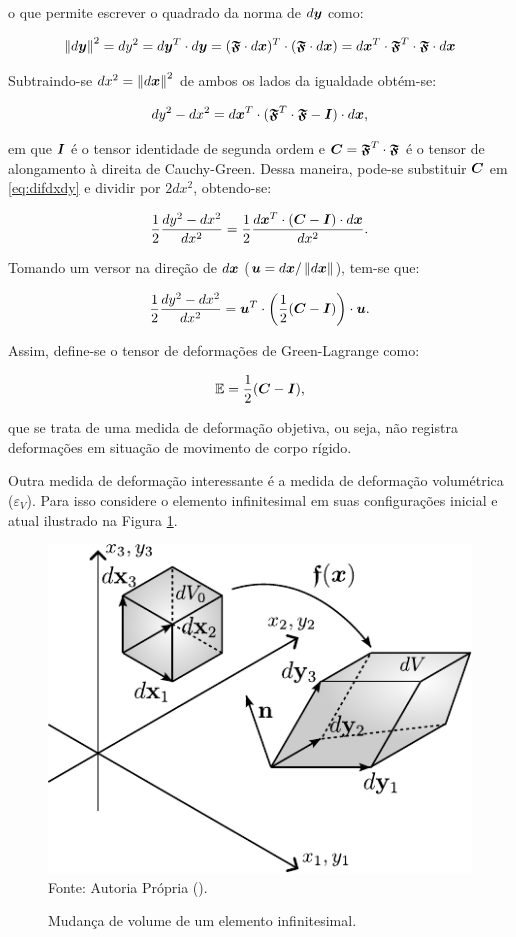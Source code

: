 \noindent o que permite escrever o quadrado da norma de $d\boldsymbol{y}$ como:

\[
    \left\lVert{d\boldsymbol{y}}\right\lVert^2=dy^2=d\boldsymbol{y}^T\cdot d\boldsymbol{y}=(\boldsymbol{\mathfrak{F}}\cdot d\boldsymbol{x})^T\cdot(\boldsymbol{\mathfrak{F}}\cdot d\boldsymbol{x})=d\boldsymbol{x}^T\cdot\boldsymbol{\mathfrak{F}}^T\cdot\boldsymbol{\mathfrak{F}}\cdot d\boldsymbol{x}
\]

Subtraindo-se $dx^2=\left\lVert{d\boldsymbol{x}}\right\lVert^2$ de ambos os lados da igualdade obtém-se:

\begin{equation}
    dy^2-dx^2=d\boldsymbol{x}^T\cdot(\boldsymbol{\mathfrak{F}}^T\cdot\boldsymbol{\mathfrak{F}}-\boldsymbol{I})\cdot d\boldsymbol{x}\text{,}
    \label{eq:difdxdy}
\end{equation}

\noindent em que $\boldsymbol{I}$ é o tensor identidade de segunda ordem e $\boldsymbol{C}=\boldsymbol{\mathfrak{F}}^T\cdot\boldsymbol{\mathfrak{F}}$ é o tensor de alongamento à direita de Cauchy-Green. Dessa maneira, pode-se substituir $\boldsymbol{C}$ em \eqref{eq:difdxdy} e dividir por $2dx^2$, obtendo-se:

\[
    \frac{1}{2}\frac{dy^2-dx^2}{dx^2}=\frac{1}{2}\frac{d\boldsymbol{x}^T\cdot(\boldsymbol{C}-\boldsymbol{I})\cdot d\boldsymbol{x}}{dx^2}\text{.}
\]

\noindent Tomando um versor na direção de $d\boldsymbol{x}$ ($\boldsymbol{u}=d\boldsymbol{x}/\left\lVert{d\boldsymbol{x}}\right\lVert$), tem-se que:

\begin{equation}
    \frac{1}{2}\frac{dy^2-dx^2}{dx^2}=\boldsymbol{u}^T\cdot\left(\frac{1}{2}(\boldsymbol{C}-\boldsymbol{I})\right)\cdot\boldsymbol{u}\text{.}
\end{equation}

Assim, define-se o tensor de deformações de Green-Lagrange como:

\begin{equation}
    \mathbb{E}=\frac{1}{2}(\boldsymbol{C}-\boldsymbol{I})\text{,}
    \label{eq:CSD-DefGreenLagr}
\end{equation}

\noindent que se trata de uma medida de deformação objetiva, ou seja, não registra deformações em situação de movimento de corpo rígido.

Outra medida de deformação interessante é a medida de deformação volumétrica ($\varepsilon_V$). Para isso considere o elemento infinitesimal em suas configurações inicial e atual ilustrado na Figura \ref{fig:MudVol}.

\begin{figure}[h!]
    \centering
    \caption{Mudança de volume de um elemento infinitesimal.}
    \includegraphics[width=0.5\linewidth]{Figuras/MudVol.pdf}
    \\Fonte: Autoria Própria (\the\year).
    \label{fig:MudVol}
\end{figure}

